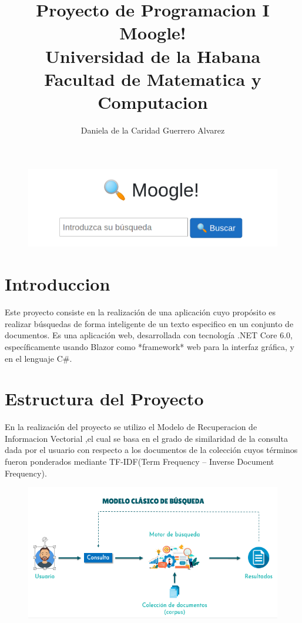 \documentclass[12 pts,spanish]{article}
\begin{document}
\title{Proyecto de Programacion I  Moogle!\\Universidad de la Habana \\ Facultad de Matematica y Computacion}
\author{Daniela de la Caridad Guerrero Alvarez}
\maketitle


\begin{figure}[ht]
    \centering
    \includegraphics[width=5in]{moogle.png}
    \caption{}
    \label{fig:Moogle}
\end{figure}
\section{Introduccion}
Este proyecto consiste en la realización de una aplicación cuyo propósito es realizar búsquedas de forma inteligente de un texto especifico en un conjunto de documentos.
Es una aplicación web, desarrollada con tecnología .NET Core 6.0, específicamente usando Blazor como *framework* web para la interfaz gráfica, y en el lenguaje C\#.

\section{Estructura del Proyecto}
En la realización del proyecto se utilizo el Modelo de Recuperacion de Informacion Vectorial ,el cual se basa en el grado de similaridad de la consulta dada por el usuario con respecto a los documentos de la colección cuyos términos fueron ponderados mediante TF-IDF(Term Frequency – Inverse Document Frequency).\\ 
\begin{figure}[h]
    \center
    \includegraphics[width=6in]{estructura.png}
    \caption{}
    \label{fig:Estructura del Proyecto}
\end{figure}
\end{document}
